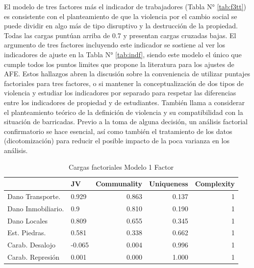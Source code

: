 \documentclass[12pt,twoside]{templates/facsothesis}
\begin{document}
El modelo de tres factores más el indicador de trabajadores (Tabla N° \ref{tab:f3tt}) es consistente con el planteamiento de que la violencia por el cambio social se puede dividir en algo más de tipo disruptivo y la destrucción de la propiedad. Todas las cargas puntúan arriba de 0.7 y presentan cargas cruzadas bajas. El argumento de tres factores incluyendo este indicador se sostiene al ver los indicadores de ajuste en la Tabla N° \ref{tab:indf}, siendo este modelo el único que cumple todos los puntos limites que propone la literatura para los ajustes de AFE. Estos hallazgos abren la discusión sobre la conveniencia de utilizar puntajes factoriales para tres factores, o si mantener la conceptualización de dos tipos de violencia y estudiar los indicadores por separado para respetar las diferencias entre los indicadores de propiedad y de estudiantes. También llama a considerar el planteamiento teórico de la definición de violencia y su compatibilidad con la situación de barricadas. Previo a la toma de alguna decisión, un análisis factorial confirmatorio se hace esencial, así como también el tratamiento de los datos (dicotomización) para reducir el posible impacto de la poca varianza en los análisis.

\begin{table}

\caption{\label{tab:f1t}Cargas factoriales Modelo 1 Factor}
\centering
\begin{tabular}[t]{l|l|r|r|r}
\hline
  & JV & Communality & Uniqueness & Complexity\\
\hline
Dano Transporte. & 0.929 & 0.863 & 0.137 & 1\\
\hline
Dano Inmobiliario. & 0.9 & 0.810 & 0.190 & 1\\
\hline
Dano Locales & 0.809 & 0.655 & 0.345 & 1\\
\hline
Est. Piedras. & 0.581 & 0.338 & 0.662 & 1\\
\hline
Carab. Desalojo & -0.065 & 0.004 & 0.996 & 1\\
\hline
Carab. Represión & 0.001 & 0.000 & 1.000 & 1\\
\hline
\end{tabular}
\end{table}
\end{document}
